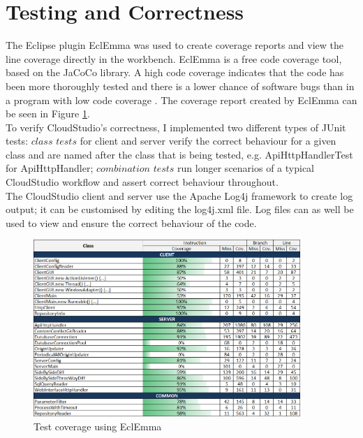 \section{Testing and Correctness}

The Eclipse plugin EclEmma \cite{eclemma} was used to create coverage reports and view the line coverage directly in the workbench. EclEmma is a free code coverage tool, based on the JaCoCo \cite{jacoco} library. A high code coverage indicates that the code has been more thoroughly tested and there is a lower chance of software bugs than in a program with low code coverage \cite{codecoverage}. The coverage report created by EclEmma can be seen in Figure \ref{fig:testcoverage}. \\

To verify CloudStudio's correctness, I implemented two different types of JUnit \cite{junit} tests: $class$ $tests$ for client and server verify the correct behaviour for a given class and are named after the class that is being tested, e.g. ApiHttpHandlerTest for ApiHttpHandler; $combination$ $tests$ run longer scenarios of a typical CloudStudio workflow and assert correct behaviour throughout. \\

The CloudStudio client and server use the Apache Log4j \cite{log4j} framework to create log output; it can be customised by editing the log4j.xml file. Log files can as well be used to view and ensure the correct behaviour of the code.


\begin{figure}[h!]
  \centering
      \includegraphics[width=0.9\textwidth]{coverage}
  \caption{Test coverage using EclEmma}
  \label{fig:testcoverage}
\end{figure}



